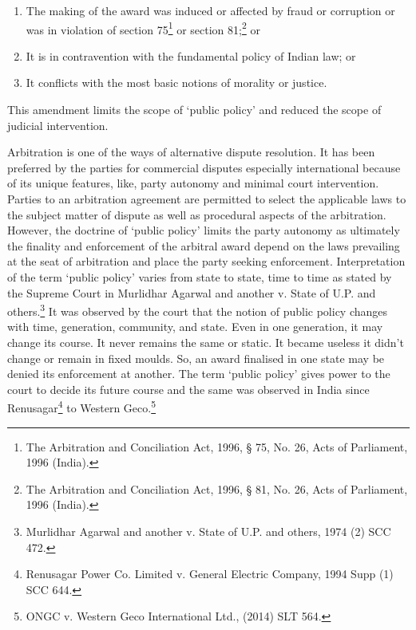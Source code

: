 \begin{multicols}{2}
\begin{enumerate}
\itemsep=0pt
\item The making of the award was induced or affected by fraud or corruption or was in violation of section 75\footnote{The Arbitration and Conciliation Act, 1996, § 75, No. 26, Acts of Parliament, 1996 (India).} or section 81;\footnote{The Arbitration and Conciliation Act, 1996, § 81, No. 26, Acts of Parliament, 1996 (India).} or

\item It is in contravention with the fundamental policy of Indian law; or

\item It conflicts with the most basic notions of morality or justice.
\end{enumerate}

\vspace{-.3cm}

\noi
This amendment limits the scope of ‘public policy’ and reduced the scope of judicial
intervention.


\noi
Arbitration is one of the ways of alternative dispute resolution. It has been preferred by the
parties for commercial disputes especially international because of its unique features, like,
party autonomy and minimal court intervention. Parties to an arbitration agreement are
permitted to select the applicable laws to the subject matter of dispute as well as procedural
aspects of the arbitration. However, the doctrine of ‘public policy’ limits the party autonomy
as ultimately the finality and enforcement of the arbitral award depend on the laws prevailing
at the seat of arbitration and place the party seeking enforcement. Interpretation of the term
‘public policy’ varies from state to state, time to time as stated by the Supreme Court in
Murlidhar Agarwal and another v. State of U.P. and others.\footnote{Murlidhar Agarwal and another v. State of U.P. and others, 1974 (2) SCC 472.} It was observed by the court that the notion of public policy changes with time, generation, community, and state. Even in one
generation, it may change its course. It never remains the same or static. It became useless it
didn’t change or remain in fixed moulds. So, an award finalised in one state may be denied its
enforcement at another. The term ‘public policy’ gives power to the court to decide its future
course and the same was observed in India since Renusagar\footnote{Renusagar Power Co. Limited v. General Electric Company, 1994 Supp (1) SCC 644.} to Western Geco.\footnote{ONGC v. Western Geco International Ltd., (2014) SLT 564.}


\end{multicols}
